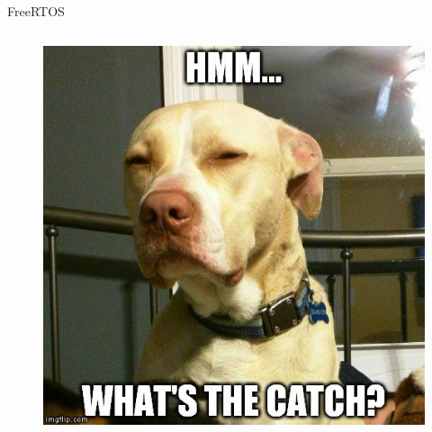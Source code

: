 \documentclass[10pt]{beamer}
\begin{document}
\begin{frame}{FreeRTOS}
\begin{columns}
    \begin{column}{0.4\textwidth}
        \begin{figure}
            \centering
            \includegraphics[width=\textwidth]{figures/WhatTheCatchMeme.jpg}
        \end{figure}
    \end{column}
    \end{columns}
\end{frame}
\end{document}
